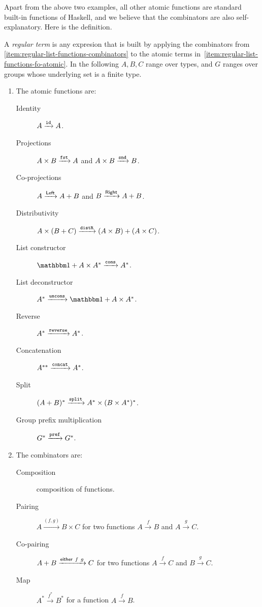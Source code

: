 Apart from the above two examples, all other atomic functions are standard built-in functions of Haskell, and we believe that the combinators are also self-explanatory. Here is the definition.

\begin{definition} \label{def:regular-terms} A \emph{regular term} is any expresion that is built by applying the combinators from \cref{item:regular-list-functions-combinators} to the atomic terms in~\cref{item:regular-list-functions-fo-atomic}. In the following $A,B,C$ range over types, and $G$ ranges over groups whose underlying set is a finite type. 
    \begin{enumerate}
        \item \label{item:regular-list-functions-fo-atomic}     The atomic functions are:
    \begin{description}
        \item[Identity]  $A \xrightarrow {\mathtt{id}} A$.
        \item[Projections]  $A \times B \xrightarrow {\mathtt{fst}} A$ and $A \times B \xrightarrow {\mathtt{snd}} B$.
        \item[Co-projections] $A \xrightarrow {\mathsf{Left}} A + B$ and $B \xrightarrow {\mathsf{Right}} A + B$.
        \item[Distributivity]  $A \times (B + C) \xrightarrow {\mathtt{distR}} (A \times B) + (A \times C)$. 
        \item[List constructor] $\onetype + A \times A^* \xrightarrow {\consterm} A^*$.
        \item[List deconstructor]  $A^* \xrightarrow {\unconsterm} \onetype + A \times A^*$.
        \item[Reverse]  $A^* \xrightarrow{\mathtt{reverse}} A^*$.
        \item[Concatenation] $A^{**} \xrightarrow{\mathtt{concat}} A^*$.
        \item[Split] $(A+B)^* \xrightarrow{\mathtt{split}} A^* \times (B \times A^*)^*$.
        \item[Group prefix multiplication] $G^* \xrightarrow{\mathtt{pref}} G^*$.
    \end{description}
    
            \item \label{item:regular-list-functions-combinators} The combinators are:
    \begin{description}
        \item[Composition] composition of functions.
        \item [Pairing]  $A \xrightarrow{(f,g)} B \times C$ for two functions   $A \xrightarrow f B$ and $A \xrightarrow g C$.
        \item [Co-pairing] $A + B \xrightarrow{\mathsf{either}\ f\ g} C$ for two functions  $A \xrightarrow f C$ and $B \xrightarrow g C$.
        \item [Map] $A^* \xrightarrow{f^*} B^*$ for a function $A \xrightarrow f B$.
    \end{description}
        
    \end{enumerate}
\end{definition}

